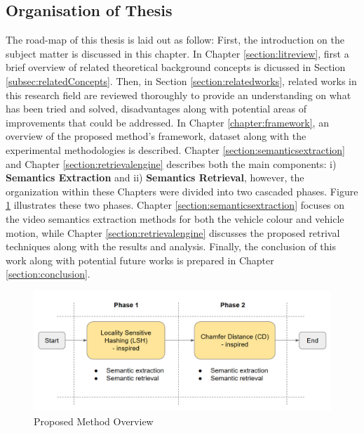 \subsection{Organisation of Thesis}

The road-map of this thesis is laid out as follow: First, the introduction on the subject matter is discussed in this chapter.
In Chapter \ref{section:litreview}, first a brief overview of related theoretical background concepts is dicussed in Section \ref{subsec:relatedConcepts}. Then, in Section \ref{section:relatedworks}, related works in this research field are reviewed thoroughly to provide an understanding on what has been tried and solved, disadvantages along with potential areas of improvements that could be addressed.
In Chapter \ref{chapter:framework}, an overview of the proposed method's framework, dataset along with the experimental methodologies is described.
Chapter \ref{section:semanticsextraction} and Chapter \ref{section:retrievalengine} describes both the main components: i) \textbf{Semantics Extraction} and ii) \textbf{Semantics Retrieval}, however, the organization within these Chapters were divided into two cascaded phases.
Figure \ref{fig:proposedmethodoverview} illustrates these two phases.
Chapter \ref{section:semanticsextraction} focuses on the video semantics extraction methods for both the vehicle colour and vehicle motion, while Chapter \ref{section:retrievalengine} discusses the proposed retrival techniques along with the results and analysis.
Finally, the conclusion of this work along with potential future works is prepared in Chapter \ref{section:conclusion}.



\begin{figure}[!hbt]\centering
\includegraphics[width=\textwidth]{image/general/phases.PNG}
\caption{Proposed Method Overview}
\label{fig:proposedmethodoverview}
\end{figure}
